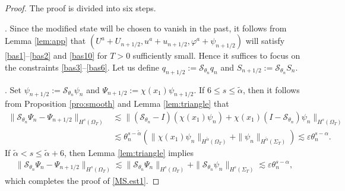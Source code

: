 \documentclass[twoside,11pt]{article}
\numberwithin{equation}{section}
\begin{document}
\begin{proof}
	The proof is divided into six steps.
	
	\vspace*{2mm}
	.\quad	
	Since the modified state will be chosen to vanish in the past,
	it follows from Lemma \ref{lem:app} that
	$(U^a+U_{n+1/2},u^a+u_{n+1/2},\varphi^a+\psi_{n+1/2})$ will satisfy \eqref{bas1}--\eqref{bas2} and \eqref{bas10} for $T>0$ sufficiently small.
	Hence it suffices to focus on the constraints \eqref{bas3}--\eqref{bas6}.
	Let us define $q_{{n}+1/2}:=\mathcal{S}_{\theta_n} q_n$ and $S_{{n}+1/2}:=\mathcal{S}_{\theta_n} S_n$.
	
	\vspace*{2mm}
	.\quad	
	Set $\psi_{{n}+1/2}:=\mathcal{S}_{\theta_n}\psi_{{n}}$
	and $\Psi_{{n}+1/2}:=\chi(x_1)\psi_{n+1/2}$.
	If $6\leq s\leq \widetilde{\alpha}$, then it follows from Proposition \ref{pro:smooth} and Lemma \ref{lem:triangle} that
	\begin{align}
		\nonumber \| \mathcal{S}_{\theta_n}\Psi_n-\Psi_{n+1/2}\|_{H^s(\Omega_{T})}
		&  \lesssim \|(\mathcal{S}_{\theta_{{n}}}-{I})(\chi( x_1) \psi_{{n}}) +\chi( x_1)({I}-\mathcal{S}_{\theta_{{n}}})\psi_{{n}}\|_{H^s(\Omega_{T})}\\
		&  \lesssim \theta_{{n}}^{s-\widetilde{\alpha}} \left(
		\|\chi( x_1) \psi_{{n}}\|_{ H^{\widetilde{\alpha}}(\Omega_{T})}
		+\|\psi_n\|_{H^{\widetilde{\alpha}}(\Sigma_T)}\right)
		\lesssim \varepsilon \theta_{{n}}^{s-{\alpha }}.
		\nonumber
	\end{align}
	If $\widetilde{\alpha}<s\leq \widetilde{\alpha}+6$, then Lemma \ref{lem:triangle} implies
	\begin{align}
		\| \mathcal{S}_{\theta_n}\Psi_n-\Psi_{n+1/2}\|_{H^s(\Omega_{T})}\nonumber
		\lesssim
		\| \mathcal{S}_{\theta_n}\Psi_n\|_{H^s(\Omega_{T})}
		+\|\mathcal{S}_{\theta_n}\psi_{{n}} \|_{H^{s}(\Sigma_T)}
		\lesssim \varepsilon \theta_{{n}}^{s-{\alpha }},
		\nonumber
	\end{align}
	which completes the proof of \eqref{MS.est1}.
	
	
	

\end{proof}
\end{document}
